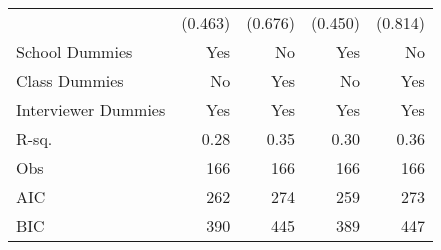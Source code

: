 \begin{table}[htbp]
\begin{tabular}{l*{4}{D{.}{.}{-1}}}
                    &             (0.463)   &             (0.676)   &             (0.450)   &             (0.814)   \\
School Dummies      &                 Yes   &                  No   &                 Yes   &                  No   \\
Class Dummies       &                  No   &                 Yes   &                  No   &                 Yes   \\
Interviewer Dummies &                 Yes   &                 Yes   &                 Yes   &                 Yes   \\
\midrule
R-sq.               &                0.28   &                0.35   &                0.30   &                0.36   \\
Obs                 &                 166   &                 166   &                 166   &                 166   \\
AIC                 &                 262   &                 274   &                 259   &                 273   \\
BIC                 &                 390   &                 445   &                 389   &                 447   \\
\bottomrule
\end{tabular}
\end{table}
